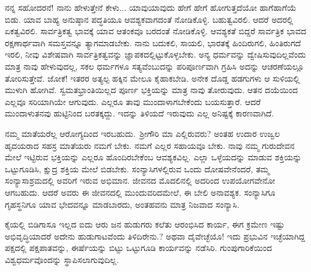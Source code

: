 ನನ್ನ ಸಹೋದರನೆ! ನಾನು ಹೇಳುತ್ತೇನೆ ಕೇಳು... ಯಾವುಯಾವುದು ಹೇಗೆ ಹೇಗೆ ಹೋಗುತ್ತದೆಯೋ ಹಾಗೆಹಾಗೆಯೆ ಬಿಡು. ಯಾವ ಬಾಹ್ಯ ಅನುಷ್ಠಾನ ಪದ್ಧತಿಯೂ ಆವಶ್ಯಕವಾಗದಂತೆ ನೋಡಿಕೊಳ್ಳಿ. ಬಹುತ್ವವಿರಲಿ. ಆದರೆ ಅದರಲ್ಲಿ ಏಕತ್ವ\-ವಿರಲಿ. ಸಾರ್ವತ್ರಿಕತ್ವ ಭಾವಕ್ಕೆ ಯಾವ ಆತಂಕವೂ ಬರದಂತೆ ನೋಡಿಕೊಳ್ಳಿ. ಆವಶ್ಯಕತೆ ಬಿದ್ದರೆ ಸಾರ್ವತ್ರಿಕ ಭಾವದ ರಕ್ಷಣಾರ್ಥವಾಗಿ ಸಮಸ್ತವನ್ನೂ ತ್ಯಾಗಮಾಡಬೇಕು. ನಾನು ಬದುಕಲಿ, ಸಾಯಲಿ, ಭಾರತಕ್ಕೆ ಹಿಂದಿರುಗಲಿ, ಹಿಂತಿರುಗದೆ ಇರಲಿ, ನೀವು ವಿಶೇಷವಾಗಿ ಸಾರ್ವತ್ರಿಕತ್ವವನ್ನು ಜ್ಞಾಪಕದಲ್ಲಿಟ್ಟುಕೊಳ್ಳಬೇಕು. ಅನ್ಯ ಧರ್ಮವನ್ನು ದ್ವೇಷಿಸುವುದಿಲ್ಲವೆಂದು ಮಾತ್ರ ನಾವು ಹೇಳುವುದಲ್ಲ, ಸಕಲ ಧರ್ಮಗಳೂ ಸತ್ಯವೆಂಬುದನ್ನು ಪರಿಪೂರ್ಣವಾಗಿ ಗ್ರಹಿಸಿ ಅದನ್ನು ಆಚರಣೆಯಲ್ಲೂ ತೋರಿಸುತ್ತೇವೆ. ಜೋಕೆ! ಇತರರ ಅತ್ಯಲ್ಪ ಹಕ್ಕಿನ ಮೇಲೂ ಕೈಹಾಕಬೇಡಿ. ಅನೇಕ ದೊಡ್ಡ ಹಡಗುಗಳು ಆ ಸುಳಿಯಲ್ಲಿ ಮುಳುಗಿ ಹೋಗಿವೆ. ಸ್ವಮತಭ್ರಾಂತಿಯಿಲ್ಲದ ಪೂರ್ಣ ಭಕ್ತಿಯನ್ನು ಮಾತ್ರ ನಾವು ತೋರುವುದು. ಆತನ ದಯೆಯಿಂದ ಎಲ್ಲವೂ ಸರಿಯಾಗಿಯೇ ಆಗುವುದು. ಎಲ್ಲರೂ ತಾವು ಮುಂದಾಳಾಗಬೇಕೆಂದು ಬಯಸುತ್ತಾರೆ. ಆದರೆ ಮುಂದಾಳುತನವು ಹುಟ್ಟಿನಿಂದ ಬರತಕ್ಕದ್ದು. ಇದನ್ನು ತಿಳಿಯದೆ ಇರುವುದು ಎಲ್ಲ ಅನಿಷ್ಟಕ್ಕೆ ಕಾರಣವಾಗಿದೆ.

ನಮ್ಮ ಮಾತೆಯರೆಲ್ಲ ಆರೋಗ್ಯದಿಂದ ಇರಬಹುದು.~ಶ‍್ರೀಗೌರಿ ಮಾ ಎಲ್ಲಿರುವರು? ಅಂತಹ ಉದಾರ ಉಜ್ವಲ ಹೃದಯರಾದ ಸಹಸ್ರ ಮಾತೆಯರು ನಮಗೆ ಬೇಕು. ನಮಗೆ ಎಲ್ಲರ ಸಹಾಯವೂ ಬೇಕು. ನಾವು ನಮ್ಮ ಗುರುದೇವನ ಮೇಲೆ ಇಟ್ಟಿರುವ ಭಕ್ತಿಯನ್ನು ಎಲ್ಲರೂ ಹೊಂದಿರಬೇಕೆಂಬ ಆವಶ್ಯಕವಿಲ್ಲ. ಎಲ್ಲಾ ಒಳ್ಳೆಯದನ್ನು ಮಾಡುವ ಶಕ್ತಿಯನ್ನು ಒಟ್ಟುಗೂಡಿಸಿ, ಕ್ಷುದ್ರ ಶಕ್ತಿಯ ಮೇಲೆ ಬಿಡಬೇಕು. ಸಂನ್ಯಾಸಿಗಳಲ್ಲಿರುವ ಒಂದು ದೋಷವೇನೆಂದರೆ, ತಮ್ಮ ಸಂನ್ಯಾಸಾಶ್ರಮದಲ್ಲಿ ಅವರಿಗೆ ಇರುವ ಅಭಿಮಾನ. ಜೀವನದ ಮೊದಲಿನಲ್ಲಿ ಅದರಿಂದ ಉಪಯೋಗವೇನೋ ಆಗಬಹುದು. ಆದರೆ ಅವರು ಈ ಜೀವನದಲ್ಲಿ ಮುಂದುವರಿದಮೇಲೆ, ಈ ಬೇಲಿ ಅನಾವಶ್ಯಕ. ಸಂನ್ಯಾಸಿಗೂ ಗೃಹಸ್ಥನಿಗೂ ಯಾವ ಭೇದವನ್ನೂ ಮಾಡಬಾರದು, ಅಂತಹವನು ಮಾತ್ರ ನಿಜವಾದ ಸಂನ್ಯಾಸಿ.

ಕೈಯಲ್ಲಿ ಬಿಡಿಗಾಸೂ ಇಲ್ಲದ ಐದು ಆರು ಜನ ಹುಡುಗರು ಕಲೆತು ಆರಂಭಿಸಿದ ಕಾರ್ಯ, ಈಗ ಕ್ರಮೇಣ ಇಷ್ಟು ಅಭಿವೃದ್ಧಿಯಾದರೆ ಅದೇನು ಹುಡುಗಾಟವೆಂದು ತಿಳಿದಿರೇನು.? ಅಥವಾ ದೈವೇಚ್ಛೆಯೊ! ಇದು ಪ್ರಭುವಿನ ಇಚ್ಛೆಯಾಗಿದ್ದ ಪಕ್ಷದಲ್ಲಿ ಪಕ್ಷಪಾತವನ್ನು, ಈರ್ಷೆಯನ್ನು ಬಿಟ್ಟು ಒಟ್ಟುಗೂಡಿ ಕಾರ್ಯವನ್ನು ನಡೆಸಿರಿ. ಗುಂಪುಗಾರಿಕೆಯಿಂದ ವಿಶ್ವಧರ್ಮವೊಂದನ್ನು ಸ್ಥಾಪಿಸಲಾಗುವುದಿಲ್ಲ.

{\fontsize{12.5}{10}\selectfont{
ಒಬ್ಬನು ದೊಡ್ಡವನಾಗಬೇಕೆಂದು ನೆನೆದ ಮಾತ್ರಕ್ಕೆ ಅವನು ದೊಡ್ಡವನಾಗಲಾರ. ಭಗವಂತ ಯಾರನ್ನು ಕೈನೀಡಿ ಮೇಲಕ್ಕೆ ಎತ್ತುತ್ತಾನೋ ಅವನು ಮಾತ್ರವೇ ಮೇಲಕ್ಕೆ ಏಳುವನು. ಅವನು ಯಾರನ್ನು ಕೆಳಕ್ಕೆ ತಳ್ಳುತ್ತಾನೋ ಅವನು ಬೀಳುವನು. ಇದನ್ನು ಜನರೆಲ್ಲರೂ ಒಂದು ದಿನ ಒಂದು ನಿಮಿಷವಾದರೂ ನೆನೆದರೆ ಆಗ ಎಲ್ಲ ತೊಂದರೆಗಳೂ ಅಡಗುವುವು. ಆದರೆ ಆ ಕೆಲಸಕ್ಕೆ ಬಾರದ ಅಹಂಕಾರವಿದೆಯಲ್ಲ! ಒಂದು ಬೆರಳನ್ನು ಕೂಡ ಅಲ್ಲಾಡಿಸಲು ಶಕ್ತಿಯಿಲ್ಲ. ಆದರೂ ಕೂಡ ನಾನು ಯಾರನ್ನೂ ಏಳಗೊಡುವುದಿಲ್ಲ ಎನ್ನ ಬೇಕಾದರೆ ಎಷ್ಟು ನಾಚಿಕೆಗೇಡು? ಅಸೂಯೆ, ನಾಲ್ವರು ಸೇರಿ ಒಂದು ಕೆಲಸವನ್ನು ಮಾಡೋಣ ಎಂಬ ಒಗ್ಗಟ್ಟಿನ ಅಭಾವ, ಇವು ಗುಲಾಮ ಜಾತಿಯವರ ಸ್ವಭಾವ. ಆದರೆ ನಾವು ಇವುಗಳಿಂದ ಪಾರಾಗುವುದಕ್ಕೆ ಪ್ರಯತ್ನಿಸಬೇಕು. ಭಯಾನಕವಾದ ಈರ್ಷೆ ನಮ್ಮ ವಿಶೇಷ ಲಕ್ಷಣ. ಪರದೇಶಗಳಿಗೆ ಹೋಗಿ ಅವುಗಳೊಂದಿಗೆ ಹೋಲಿಸಿ ನೋಡಿದಾಗ ಗೊತ್ತಾಗುವುದು. ಈ ವಿಷಯದಲ್ಲಿ ನಮ್ಮನ್ನು ಹೋಲುವವರು ಯಾರೆಂದರೆ, ಅಮೆರಿಕದ ವಿಮುಕ್ತರಾದ ನೀಗ್ರೋ ಜನರು. ಅವರಲ್ಲಿ ಯಾವನಾದರೊಬ್ಬ ಕೊಂಚ ತಲೆಎತ್ತಿದರೆ ಸಾಕು, ಎಲ್ಲರೂ ಒಡನೆಯೇ ಕಲೆತು, ಅವನಿಗೆ ವಿರುದ್ಧವಾಗಿ ಬಿಳಿಯವರೊಡನೆ ಸೇರಿಕೊಂಡು, ಅವನನ್ನು ನೆಲಕ್ಕೆ ತುಳಿಯುವುದಕ್ಕೆ ಪ್ರಯತ್ನಪಡುವರು.}}

